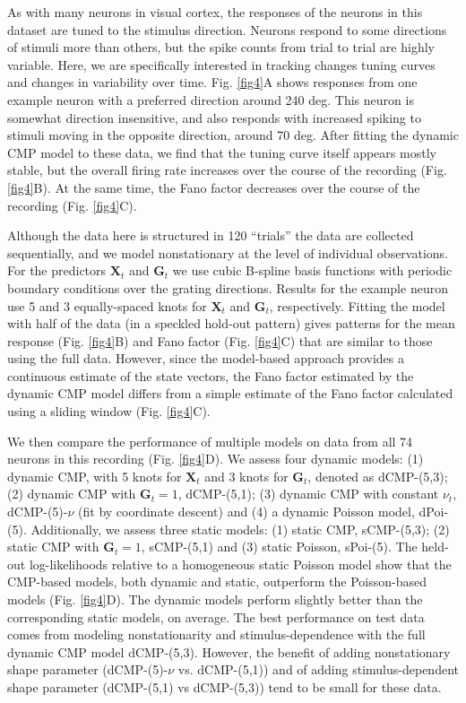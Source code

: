 \documentclass[]{article}
\begin{document}
	As with many neurons in visual cortex, the responses of the neurons in this dataset are tuned to the stimulus direction. Neurons respond to some directions of stimuli more than others, but the spike counts from trial to trial are highly variable. Here, we are specifically interested in tracking changes tuning curves and changes in variability over time. Fig. \ref{fig4}A shows responses from one example neuron with a preferred direction around 240 deg. This neuron is somewhat direction insensitive, and also responds with increased spiking to stimuli moving in the opposite direction, around 70 deg. After fitting the dynamic CMP model to these data, we find that the tuning curve itself appears mostly stable, but the overall firing rate increases over the course of the recording (Fig. \ref{fig4}B). At the same time, the Fano factor decreases over the course of the recording (Fig. \ref{fig4}C). 
	
	Although the data here is structured in 120 “trials” the data are collected sequentially, and we model nonstationary at the level of individual observations. For the predictors $\bm{X}_t$ and $\bm{G}_t$ we use cubic B-spline basis functions with periodic boundary conditions over the grating directions. Results for the example neuron use 5 and 3 equally-spaced knots for $\bm{X}_t$ and $\bm{G}_t$, respectively. Fitting the model with half of the data (in a speckled hold-out pattern) gives patterns for the mean response (Fig. \ref{fig4}B) and Fano factor (Fig. \ref{fig4}C) that are similar to those using the full data. However, since the model-based approach provides a continuous estimate of the state vectors, the Fano factor estimated by the dynamic CMP model differs from a simple estimate of the Fano factor calculated using a sliding window (Fig. \ref{fig4}C).
	
	We then compare the performance of multiple models on data from all 74 neurons in this recording (Fig. \ref{fig4}D). We assess four dynamic models: (1) dynamic CMP, with 5 knots for $\bm{X}_t$ and 3 knots for $\bm{G}_t$, denoted as dCMP-(5,3); (2) dynamic CMP with $\bm{G}_t=1$, dCMP-(5,1); (3) dynamic CMP with constant $\nu_t$, dCMP-(5)-$\nu$ (fit by coordinate descent) and (4) a dynamic Poisson model, dPoi-(5). Additionally, we assess three static models: (1) static CMP, sCMP-(5,3); (2) static CMP with $\bm{G}_t=1$, sCMP-(5,1) and (3) static Poisson, sPoi-(5). The held-out log-likelihoods relative to a homogeneous static Poisson model show that the CMP-based models, both dynamic and static, outperform the Poisson-based models (Fig. \ref{fig4}D). The dynamic models perform slightly better than the corresponding static models, on average. The best performance on test data comes from modeling nonstationarity and stimulus-dependence with the full dynamic CMP model dCMP-(5,3). However, the benefit of adding nonstationary shape parameter (dCMP-(5)-$\nu$ vs. dCMP-(5,1)) and of adding stimulus-dependent shape parameter (dCMP-(5,1) vs dCMP-(5,3)) tend to be small for these data.
	
\end{document}
